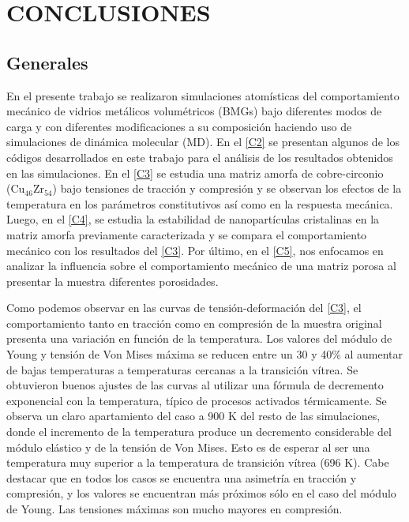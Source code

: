 
\chapter{CONCLUSIONES} %

\label{C6} %



\section{Generales}

En el presente trabajo se realizaron simulaciones atomísticas del comportamiento mecánico de vidrios metálicos volumétricos (BMGs) bajo diferentes modos de carga y con diferentes modificaciones a su composición haciendo uso de simulaciones de dinámica molecular (MD). En el \cref{C2} se presentan algunos de los códigos desarrollados en este trabajo para el análisis de los resultados obtenidos en las simulaciones. En el \cref{C3} se estudia una matriz amorfa de cobre-circonio (Cu$_{46}$Zr$_{54}$) bajo tensiones de tracción y compresión y se observan los efectos de la temperatura en los parámetros constitutivos así como en la respuesta mecánica. Luego, en el \cref{C4}, se estudia la estabilidad de nanopartículas cristalinas en la matriz amorfa previamente caracterizada y se compara el comportamiento mecánico con los resultados del \cref{C3}. Por último, en el \cref{C5}, nos enfocamos en analizar la influencia sobre el comportamiento mecánico de una matriz porosa al presentar la muestra diferentes porosidades.

Como podemos observar en las curvas de tensión-deformación del \cref{C3}, el comportamiento tanto en tracción como en compresión de la muestra original presenta una variación en función de la temperatura. Los valores del módulo de Young y tensión de Von Mises máxima se reducen entre un 30 y 40\% al aumentar de bajas temperaturas a temperaturas cercanas a la transición vítrea. Se obtuvieron buenos ajustes de las curvas al utilizar una fórmula de decremento exponencial con la temperatura, típico de procesos activados térmicamente. Se observa un claro apartamiento del caso a 900 K del resto de las simulaciones, donde el incremento de la temperatura produce un decremento considerable del módulo elástico y de la tensión de Von Mises. Esto es de esperar al ser una temperatura muy superior a la temperatura de transición vítrea (696 K). Cabe destacar que en todos los casos se encuentra una asimetría en tracción y compresión, y los valores se encuentran más próximos sólo en el caso del módulo de Young. Las tensiones máximas son mucho mayores en compresión.

